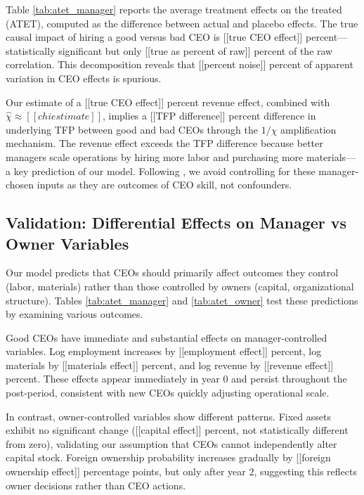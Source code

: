 \documentclass[11pt,a4paper]{article}
\begin{document}
Table \ref{tab:atet_manager} reports the average treatment effects on the treated (ATET), computed as the difference between actual and placebo effects. The true causal impact of hiring a good versus bad CEO is [[true CEO effect]] percent—statistically significant but only [[true as percent of raw]] percent of the raw correlation. This decomposition reveals that [[percent noise]] percent of apparent variation in CEO effects is spurious.

Our estimate of a [[true CEO effect]] percent revenue effect, combined with $\hat{\chi} \approx [[chi estimate]]$, implies a [[TFP difference]] percent difference in underlying TFP between good and bad CEOs through the $1/\chi$ amplification mechanism. The revenue effect exceeds the TFP difference because better managers scale operations by hiring more labor and purchasing more materials—a key prediction of our model. Following \citet{Gandhi2020-nu}, we avoid controlling for these manager-chosen inputs as they are outcomes of CEO skill, not confounders.



\subsection{Validation: Differential Effects on Manager vs Owner Variables}

Our model predicts that CEOs should primarily affect outcomes they control (labor, materials) rather than those controlled by owners (capital, organizational structure). Tables \ref{tab:atet_manager} and \ref{tab:atet_owner} test these predictions by examining various outcomes.

Good CEOs have immediate and substantial effects on manager-controlled variables. Log employment increases by [[employment effect]] percent, log materials by [[materials effect]] percent, and log revenue by [[revenue effect]] percent. These effects appear immediately in year 0 and persist throughout the post-period, consistent with new CEOs quickly adjusting operational scale.



In contrast, owner-controlled variables show different patterns. Fixed assets exhibit no significant change ([[capital effect]] percent, not statistically different from zero), validating our assumption that CEOs cannot independently alter capital stock. Foreign ownership probability increases gradually by [[foreign ownership effect]] percentage points, but only after year 2, suggesting this reflects owner decisions rather than CEO actions.
\end{document}
